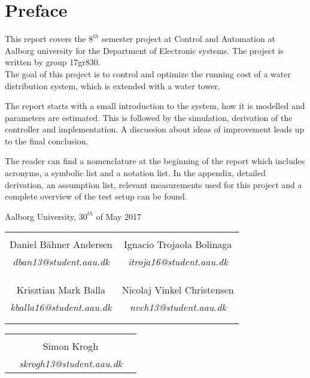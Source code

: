 \chapter*{Preface}

This report covers the $8^{th}$ semester project at Control and Automation at Aalborg university for the Department of Electronic systems. The project is written by group 17gr830.\\
The goal of this project is to control and optimize the running cost of a water distribution system, which is extended with a water tower.  

The report starts with a small introduction to the system, how it is modelled and parameters are estimated. This is followed by the simulation, derivation of the controller and implementation. A discussion about ideas of improvement leads up to the final conclusion. 

The reader can find a nomenclature at the beginning of the report which includes acronyms, a symbolic list and a notation list. In the appendix, detailed derivation, an assumption list, relevant measurements used for this project and a complete overview of the test setup can be found.


\hfill Aalborg University, $30^{th}$ of May 2017




\vfill

\begin{table}[H]
	\centering
		\begin{tabular}{c c }
			\underline{\phantom{mmmmmmmmmmmmmmmmmmm}}       & \underline{\phantom{mmmmmmmmmmmmmmmmmmm}} \\
			Daniel Bähner Andersen			 & Ignacio Trojaola Bolinaga  \\
			\textit{dban13@student.aau.dk} & \textit{itroja16@student.aau.dk}\\
			&\\
			&\\
			\underline{\phantom{mmmmmmmmmmmmmmmmmmm}}       & \underline{\phantom{mmmmmmmmmmmmmmmmmmm}} \\
			Krisztian Mark Balla			 & Nicolaj Vinkel Christensen \\
			\textit{kballa16@student.aau.dk} & \textit{nvch13@student.aau.dk} \\
			&\\
			&\\	
		\end{tabular}
		\begin{tabular}{c c c}
			& \underline{\phantom{mmmmmmmmmmmmmmmmmmm}} 	& \\
			& Simon Krogh					& \\
			& \textit{skrogh13@student.aau.dk}		& \\
		\end{tabular}
\end{table}